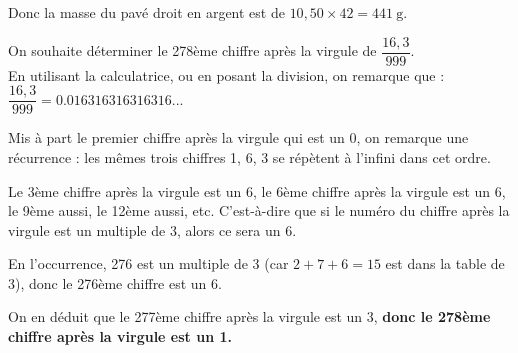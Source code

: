 \documentclass[../Cours.tex]{subfiles}
\begin{document}
\begin{questions}
    Donc la masse du pavé droit en argent est de $10,50 \times 42 = \qty{441}{\g}$.

     On souhaite déterminer le 278ème chiffre après la virgule de $\dfrac{16,3}{999}$.\\

    En utilisant la calculatrice, ou en posant la division, on remarque que :
    $\dfrac{16,3}{999} = \num{0,016 316 316 316 316}...$

    Mis à part le premier chiffre après la virgule qui est un 0, on remarque une récurrence : les mêmes trois chiffres 1, 6, 3 se répètent à l'infini dans cet ordre.

    Le 3ème chiffre après la virgule est un 6, le 6ème chiffre après la virgule est un 6, le 9ème aussi, le 12ème aussi, etc. C'est-à-dire que si le numéro du chiffre après la virgule est un multiple de 3, alors ce sera un 6.

    En l'occurrence, 276 est un multiple de 3 (car $2 + 7 + 6 = 15$ est dans la table de 3), donc le 276ème chiffre est un 6.

    On en déduit que le 277ème chiffre après la virgule est un 3, \textbf{donc le 278ème chiffre après la virgule est un 1.}
    
\end{questions}
\end{document}
